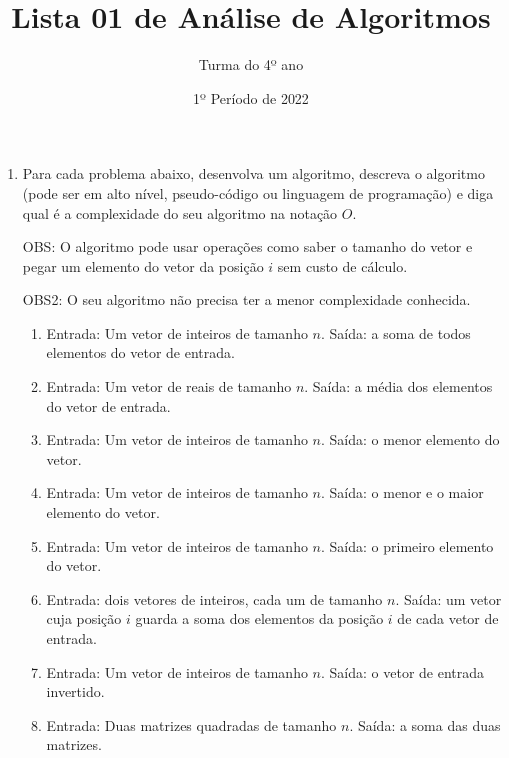 \documentclass[12pt]{article}
\title{Lista 01 de Análise de Algoritmos}
\date{1º Período de 2022}
\author{Turma do 4º ano}
\begin{document}
 

\maketitle

\vspace{3em}



\begin{enumerate}

\item Para cada problema abaixo, desenvolva um algoritmo, descreva o algoritmo (pode ser em alto nível, pseudo-código ou linguagem de programação) e diga qual é a complexidade do seu algoritmo na notação $O$.

OBS: O algoritmo pode usar operações como saber o tamanho do vetor e pegar um elemento do vetor da posição $i$ sem custo de cálculo.

OBS2: O seu algoritmo não precisa ter a menor complexidade conhecida.

\begin{enumerate}

\item Entrada: Um vetor de inteiros de tamanho $n$. Saída: a soma de todos elementos do vetor de entrada.

\item Entrada: Um vetor de reais de tamanho $n$. Saída: a média dos elementos do vetor de entrada.

\item Entrada: Um vetor de inteiros de tamanho $n$. Saída: o menor elemento do vetor.

\item Entrada: Um vetor de inteiros de tamanho $n$. Saída: o menor e o maior elemento do vetor.

\item Entrada: Um vetor de inteiros de tamanho $n$. Saída: o primeiro elemento do vetor.

\item Entrada: dois vetores de inteiros, cada um de tamanho $n$. Saída: um vetor cuja posição $i$ guarda a soma dos elementos da posição $i$ de cada vetor de entrada.

\item Entrada: Um vetor de inteiros de tamanho $n$. Saída: o vetor de entrada invertido.

\item Entrada: Duas matrizes quadradas de tamanho $n$. Saída: a soma das duas matrizes.


\end{enumerate}
\end{enumerate}
\end{document}
